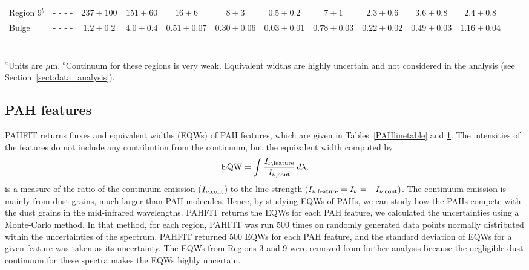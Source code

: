 \begin{table}
\begin{minipage}{200mm}
\begin{tabular}{l c c  c  c  c  c  c  c  c  c c }
 Region 9$^b$ & - - - -                 & $237\pm100$          & $151\pm60$        & $16\pm6$                 & $8\pm3$                   & $0.5\pm0.2$             & $7\pm1$                   & $2.3\pm0.6$             & $3.6\pm0.8$                 & $2.4\pm0.8$  \\
 Bulge       & - - - -                          & $1.2\pm0.2$            & $4.0\pm0.4$        & $0.51\pm0.07$         & $0.30\pm0.06$        & $0.03\pm0.01$        & $0.78\pm0.03$        & $0.22\pm0.02$        & $0.49\pm0.03$            & $1.16\pm0.04$ \\             
\hline
 \label{EQW}
\end{tabular}\\
{$^a$Units are $\mu$m. 
$^b$Continuum for these regions is very weak.  Equivalent widths are highly uncertain and not considered in the analysis (see Section~\ref{sect:data_analysis}).}
\end{minipage}
\end{table}



\subsection{PAH features}
\label{sect:pah}

PAHFIT returns fluxes and equivalent widths (EQWs) of PAH features, which are given in Tables~\ref{PAHlinetable} and \ref{EQW}. 
The intensities of the features do not include any contribution from the continuum, but the equivalent width computed by
\begin{equation}
{\rm EQW}=\int \frac{I_{\nu,{\rm feature}}}{I_{\nu, {\rm cont}}} \,d\lambda,
\end{equation}
is a measure of the ratio of the continuum emission ($I_{\nu, {\rm cont}} $) to the line strength 
($I_{\nu,{\rm feature}}=I_{\nu} =- I_{\nu, {\rm cont}})$. 
The continuum emission is mainly from dust grains, much larger than PAH molecules. Hence, by studying EQWs of PAHs, 
we can study how the PAHs compete with the dust grains in the mid-infrared wavelengths.  PAHFIT returns the EQWs for each PAH 
feature, we calculated the uncertainties using a Monte-Carlo method. In that method, for each region, PAHFIT was run 500 times on 
randomly generated data points  normally distributed within the uncertainties of the spectrum. PAHFIT returned 500 EQWs for each 
PAH feature, and the standard deviation of EQWs for a given feature was taken as its uncertainty. 
The EQWs from Regions 3 and 9 were removed from further analysis because the negligible dust continuum for these spectra makes
the EQWs highly uncertain.


